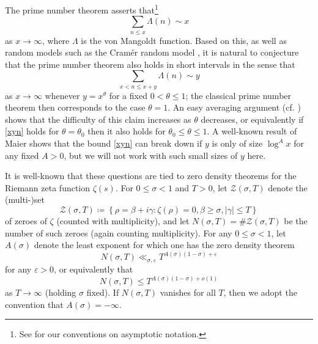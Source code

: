 \documentclass[12pt]{amsart}
\newcommand{\eps}{\varepsilon}
\begin{document}
The prime number theorem asserts that\footnote{See  for our conventions on asymptotic notation.}
$$ \sum_{n \leq x} \Lambda(n) \sim x$$
as $x \to \infty$, where $\Lambda$ is the von Mangoldt function.  Based on this, as well as random models such as the Cram\'er random model \cite{cramer}, it is natural to conjecture that the prime number theorem also holds in short intervals in the sense that
\begin{equation}\label{xyn}
 \sum_{x < n \leq x+y} \Lambda(n) \sim y
\end{equation}
as $x \to \infty$ whenever $y = x^\theta$ for a fixed $0 < \theta \leq 1$; the classical prime number theorem then corresponds to the case $\theta=1$.  An easy averaging argument (cf.  \cite[Corollary 1(i)]{bp}) shows that the difficulty of this claim increases as $\theta$ decreases, or equivalently if \eqref{xyn} holds for $\theta = \theta_0$ then it also holds for $\theta_0 \leq \theta \leq 1$.  A well-known result of Maier \cite{Maier} shows that the bound \eqref{xyn} can break down if $y$ is only of size $\log^A x$ for any fixed $A>0$, but we will not work with such small sizes of $y$ here.

It is well-known that these questions are tied to zero density theorems for the Riemann zeta function $\zeta(s)$.
For $0 \le \sigma < 1$ and $T>0$, let $\mathcal{Z}(\sigma,T)$ denote the (multi-)set
\begin{equation}
\mathcal{Z}(\sigma, T) \coloneqq  \left\{ \rho = \beta + i\gamma : \zeta(\rho)=0, \beta\ge \sigma, |\gamma|\le T \right\}
\end{equation}
of zeroes of $\zeta$ (counted with multiplicity), and let $N(\sigma, T) = \#\mathcal{Z}(\sigma, T)$ be the number of such zeroes (again counting multiplicity).  For any $0 \leq \sigma < 1$, let $A(\sigma)$ denote the least exponent for which one has the zero density theorem
$$N(\sigma, T) \ll_{\sigma, \eps} T^{A(\sigma)(1-\sigma) + \eps}$$
for any $\eps>0$, or equivalently that
\begin{equation}\label{nsig-up}
  N(\sigma, T) \leq T^{A(\sigma)(1-\sigma) + o(1)}
\end{equation}
as $T \to \infty$ (holding $\sigma$ fixed).  If $N(\sigma,T)$ vanishes for all $T$, then we adopt the convention that $A(\sigma)=-\infty$.
\end{document}
